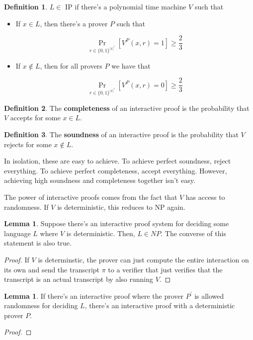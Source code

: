 \documentclass{article}
\theoremstyle{definition}
\newtheorem{definition}{Definition}
\newtheorem{lemma}[theorem]{Lemma}
\newcommand{\xtoc}{\lvert x \rvert ^{c}}
\begin{document}
\begin{definition}
    $L \in$ IP if there's a polynomial time machine $V$ such that 

    \begin{itemize}
        \item If $x \in L$, then there's a prover $P$ such that 

        \[ \Pr_{r \in \{0,1\}^{\xtoc}}[V^{P}(x,r) = 1] \geq \frac{2}{3}\]

        \item If $x \notin L$, then for all provers $P$ we have that 

            \[ \Pr_{r \in \{0,1\}^{\xtoc}}[V^{P}(x,r) = 0] \geq \frac{2}{3}\]
    \end{itemize}
\end{definition}

\begin{definition}
    The \textbf{completeness} of an interactive proof is the probability that $V$ accepts for some $x \in L$.
\end{definition}

\begin{definition}
    The \textbf{soundness} of an interactive proof is the probability that $V$ rejects for some $x \notin L$.
\end{definition}

In isolation, these are easy to achieve. To achieve perfect soundness, reject everything. To achieve perfect completeness, accept everything. However, achieving high soundness and completeness together isn't easy.

The power of interactive proofs comes from the fact that $V$ has access to randomness. If $V$ is deterministic, this reduces to NP again.

\begin{lemma}
    Suppose there's an interactive proof system for deciding some language
    $L$ where $V$ is deterministic. Then, $L \in NP$. The converse of this
    statement is also true.
\end{lemma}
\begin{proof}
    If $V$ is determinstic, the prover can just compute the entire
    interaction on its own and send the transcript $\pi$ to a verifier
    that just verifies that the transcript is an actual transcript
    by also running $V$.
\end{proof}

\begin{lemma}
    If there's an interactive proof where the prover $P^{\prime}$ is allowed randomness
    for deciding $L$, there's an interactive proof with a deterministic prover $P$.
\end{lemma}
\begin{proof}
    
\end{proof}
\end{document}
